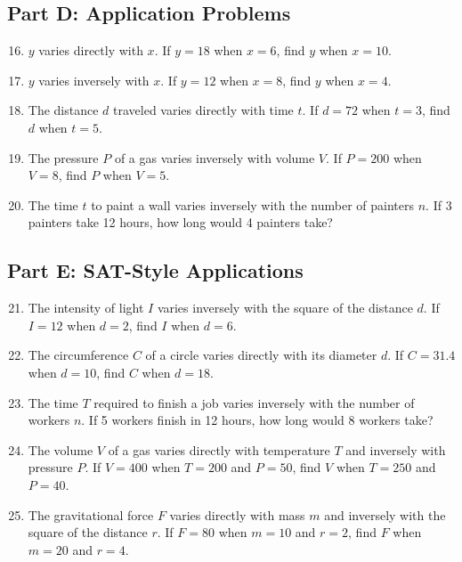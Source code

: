 \documentclass[12pt]{article}
\begin{document}
\subsection*{Part D: Application Problems}
\begin{enumerate}
  \setcounter{enumi}{15}
  \item \(y\) varies directly with \(x\). If \(y = 18\) when \(x = 6\), find \(y\) when \(x = 10\).
  \item \(y\) varies inversely with \(x\). If \(y = 12\) when \(x = 8\), find \(y\) when \(x = 4\).
  \item The distance \(d\) traveled varies directly with time \(t\). If \(d = 72\) when \(t = 3\), find \(d\) when \(t = 5\).
  \item The pressure \(P\) of a gas varies inversely with volume \(V\). If \(P = 200\) when \(V = 8\), find \(P\) when \(V = 5\).
  \item The time \(t\) to paint a wall varies inversely with the number of painters \(n\). If 3 painters take 12 hours, how long would 4 painters take?
\end{enumerate}

\subsection*{Part E: SAT-Style Applications}
\begin{enumerate}
  \setcounter{enumi}{20}
  \item The intensity of light \(I\) varies inversely with the square of the distance \(d\). If \(I = 12\) when \(d = 2\), find \(I\) when \(d = 6\).
  \item The circumference \(C\) of a circle varies directly with its diameter \(d\). If \(C = 31.4\) when \(d = 10\), find \(C\) when \(d = 18\).
  \item The time \(T\) required to finish a job varies inversely with the number of workers \(n\). If 5 workers finish in 12 hours, how long would 8 workers take?
  \item The volume \(V\) of a gas varies directly with temperature \(T\) and inversely with pressure \(P\). If \(V = 400\) when \(T = 200\) and \(P = 50\), find \(V\) when \(T = 250\) and \(P = 40\).
  \item The gravitational force \(F\) varies directly with mass \(m\) and inversely with the square of the distance \(r\). If \(F = 80\) when \(m = 10\) and \(r = 2\), find \(F\) when \(m = 20\) and \(r = 4\).
\end{enumerate}
\end{document}
